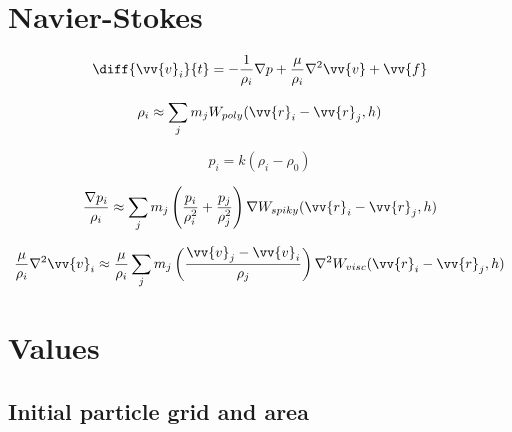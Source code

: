 \documentclass[11pt,norsk,a4paper]{article}
\begin{document}
\section{Navier-Stokes}

\begin{equation}
    \diff{\vv{v}_i}{t} =
    - \frac{1}{\rho_i} \nabla p
    + \frac{\mu}{\rho_i} \nabla^2 \vv{v}
    + \vv{f}
\end{equation}

\begin{equation}
    \rho_i \approx
    \sum_{j} m_j
    W_{poly}(\vv{r}_i - \vv{r}_j, h)
\end{equation}

\begin{equation}
    p_i = k (\rho_i - \rho_0)
\end{equation}

\begin{equation}
    \frac{\nabla p_i}{\rho_i} \approx
    \sum_j m_j \left( \frac{p_i}{\rho_i^2} + \frac{p_j}{\rho_j^2} \right)
    \nabla W_{spiky}(\vv{r}_i - \vv{r}_j, h)
\end{equation}

\begin{equation}
    \frac{\mu}{\rho_i} \nabla^2 \vv{v}_i \approx
    \frac{\mu}{\rho_i} \sum_j m_j \left( \frac{\vv{v}_j - \vv{v}_i}{\rho_j} \right)
    \nabla^2 W_{visc}(\vv{r}_i - \vv{r}_j, h)
\end{equation}


\newpage
\section{Values}

\subsection{Initial particle grid and area}

\begin{figure}[h]
    \centering
\end{figure}
\end{document}
